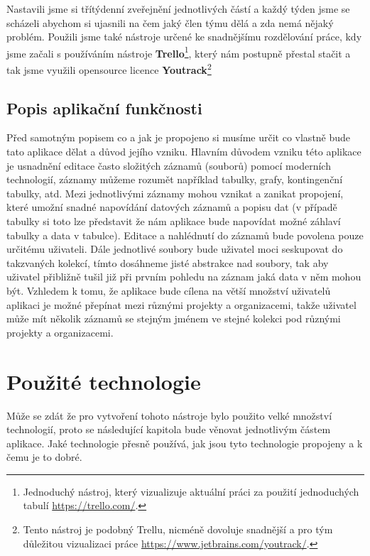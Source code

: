 \par Nastavili jsme si třítýdenní zveřejnění jednotlivých částí a každý týden jsme se scházeli abychom si ujasnili na čem jaký člen týmu dělá a zda nemá nějaký problém. Použili jsme také nástroje určené ke snadnějšímu rozdělování práce, kdy jsme začali s používáním nástroje \textbf{Trello}\footnote{Jednoduchý nástroj, který vizualizuje aktuální práci za použití jednoduchých tabulí \url{https://trello.com/}.}, který nám postupně přestal stačit a tak jsme využili opensource licence \textbf{Youtrack}\footnote{Tento nástroj je podobný Trellu, nicméně dovoluje snadnější a pro tým důležitou vizualizaci práce \url{https://www.jetbrains.com/youtrack/}.}

\subsection{Popis aplikační funkčnosti}
\par Před samotným popisem co a jak je propojeno si musíme určit co vlastně bude tato aplikace dělat a důvod jejího vzniku. Hlavním důvodem vzniku této aplikace je usnadnění editace často složitých záznamů (souborů) pomocí moderních technologií, záznamy můžeme rozumět například tabulky, grafy, kontingenční tabulky, atd. Mezi jednotlivými záznamy mohou vznikat a zanikat propojení, které umožní snadné napovídání datových záznamů a popisu dat (v případě tabulky si toto lze představit že nám aplikace bude napovídat možné záhlaví tabulky a data v tabulce). Editace a nahlédnutí do záznamů bude povolena pouze určitému uživateli. Dále jednotlivé soubory bude uživatel moci seskupovat do takzvaných kolekcí, tímto dosáhneme jisté abstrakce nad soubory, tak aby uživatel přibližně tušil již při prvním pohledu na záznam jaká data v něm mohou být. Vzhledem k tomu, že aplikace bude cílena na větší množství uživatelů aplikaci je možné přepínat mezi různými projekty a organizacemi, takže uživatel může mít několik záznamů se stejným jménem ve stejné kolekci pod různými projekty a organizacemi.

\section{Použité technologie}
\par Může se zdát že pro vytvoření tohoto nástroje bylo použito velké množství technologií, proto se následující kapitola bude věnovat jednotlivým částem aplikace. Jaké technologie přesně používá, jak jsou tyto technologie propojeny a k čemu je to dobré.

